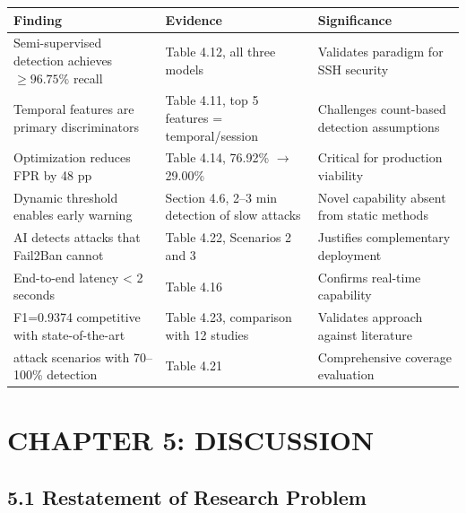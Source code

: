 \documentclass[
  a4paper]{report}
\newcounter{none} %
\begin{document}
{\def\LTcaptype{none} %
\begin{longtable}[]{@{}
  >{\raggedright\arraybackslash}p{}
  >{\raggedright\arraybackslash}p{}
  >{\raggedright\arraybackslash}p{}@{}}
\toprule\noalign{}
\begin{minipage}[b]{\linewidth}\raggedright
Finding
\end{minipage} & \begin{minipage}[b]{\linewidth}\raggedright
Evidence
\end{minipage} & \begin{minipage}[b]{\linewidth}\raggedright
Significance
\end{minipage} \\
\midrule\noalign{}
\endhead
\bottomrule\noalign{}
\endlastfoot
Semi-supervised detection achieves \(\geq 96.75\%\) recall & Table 4.12,
all three models & Validates paradigm for SSH security \\
Temporal features are primary discriminators & Table 4.11, top 5
features = temporal/session & Challenges count-based detection
assumptions \\
Optimization reduces FPR by 48 pp & Table 4.14, 76.92\% \(\rightarrow\)
29.00\% & Critical for production viability \\
Dynamic threshold enables early warning & Section 4.6, 2--3 min
detection of slow attacks & Novel capability absent from static
methods \\
AI detects attacks that Fail2Ban cannot & Table 4.22, Scenarios 2 and 3
& Justifies complementary deployment \\
End-to-end latency \textless{} 2 seconds & Table 4.16 & Confirms
real-time capability \\
F1=0.9374 competitive with state-of-the-art & Table 4.23, comparison
with 12 studies & Validates approach against literature \\
5 attack scenarios with 70--100\% detection & Table 4.21 & Comprehensive
coverage evaluation \\
\end{longtable}
}

\chapter{CHAPTER 5: DISCUSSION}\label{chapter-5-discussion}

\section{5.1 Restatement of Research
Problem}\label{restatement-of-research-problem}
\end{document}
